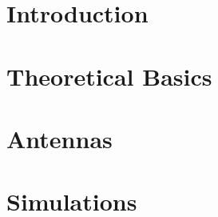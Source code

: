 \documentclass[11pt]{article}
\begin{document}
\noindent

\cleardoublepage
\fi

	\tableofcontents  

\newpage
	\listoffigures 

\newpage
	\listoftables
	
\cleardoublepage

\pagestyle{headings}

\section{Introduction}

\section{Theoretical Basics}








\section{Antennas}


\section{Simulations}



\newpage

\cleardoublepage
\printbibliography
\end{document}
